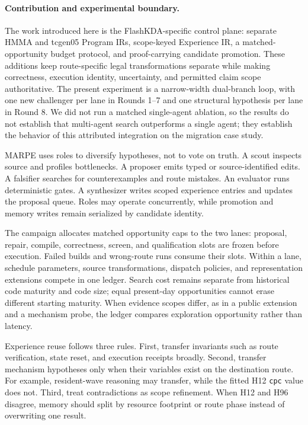 \documentclass[11pt]{article}
\newcommand{\cpc}{\texttt{cpc}}
\begin{document}
\paragraph{Contribution and experimental boundary.}
The work introduced here is the FlashKDA-specific control plane: separate HMMA and tcgen05 Program IRs, scope-keyed Experience IR, a matched-opportunity budget protocol, and proof-carrying candidate promotion. These additions keep route-specific legal transformations separate while making correctness, execution identity, uncertainty, and permitted claim scope authoritative. The present experiment is a narrow-width dual-branch loop, with one new challenger per lane in Rounds 1--7 and one structural hypothesis per lane in Round 8. We did not run a matched single-agent ablation, so the results do not establish that multi-agent search outperforms a single agent; they establish the behavior of this attributed integration on the migration case study.

MARPE uses roles to diversify hypotheses, not to vote on truth. A scout inspects source and profiles bottlenecks. A proposer emits typed or source-identified edits. A falsifier searches for counterexamples and route mistakes. An evaluator runs deterministic gates. A synthesizer writes scoped experience entries and updates the proposal queue. Roles may operate concurrently, while promotion and memory writes remain serialized by candidate identity.

The campaign allocates matched opportunity caps to the two lanes: proposal, repair, compile, correctness, screen, and qualification slots are frozen before execution. Failed builds and wrong-route runs consume their slots. Within a lane, schedule parameters, source transformations, dispatch policies, and representation extensions compete in one ledger. Search cost remains separate from historical code maturity and code size; equal present-day opportunities cannot erase different starting maturity. When evidence scopes differ, as in a public extension and a mechanism probe, the ledger compares exploration opportunity rather than latency.

Experience reuse follows three rules. First, transfer invariants such as route verification, state reset, and execution receipts broadly. Second, transfer mechanism hypotheses only when their variables exist on the destination route. For example, resident-wave reasoning may transfer, while the fitted H12 \cpc{} value does not. Third, treat contradictions as scope refinement. When H12 and H96 disagree, memory should split by resource footprint or route phase instead of overwriting one result.
\end{document}
